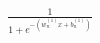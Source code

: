 \documentclass[preview]{standalone}
\begin{document}
\begin{align*}
\frac{1}{1+e^{-(w_n^{(1)}x+b_n^{(1)})}}
\end{align*}
\end{document}

